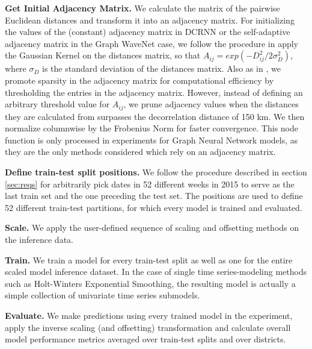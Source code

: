 \vspace{1em}
\noindent
\textbf{Get Initial Adjacency Matrix.}  We calculate the matrix of the pairwise Euclidean distances and transform it into an adjacency matrix.
For initializing the values of the (constant) adjacency matrix in DCRNN or the self-adaptive adjacency matrix in the Graph WaveNet case, we follow the procedure in \cite{li2018dcrnn, wu2019graphwavenet} apply the Gaussian Kernel on the distances matrix, so that $A_{ij} = exp(-D_{ij}^2/2\sigma_{D}^2)$, where $\sigma_{D}$ is the standard deviation of the distances matrix.
Also as in \cite{li2018dcrnn}, we promote sparsity in the adjacency matrix for computational efficiency by thresholding the entries in the adjacency matrix.
However, instead of defining an arbitrary threshold value for $A_{ij}$, we prune adjacency values when the distances they are calculated from surpasses the decorrelation distance of 150 km.
We then normalize columnwise by the Frobenius Norm for faster convergence.
This node function is only processed in experiments for Graph Neural Network models, as they are the only methods considered which rely on an adjacency matrix.

\vspace{1em}
\noindent
\textbf{Define train-test split positions.} We follow the procedure described in section \ref{sec:reqs} for arbitrarily pick dates in 52 different weeks in 2015 to serve as the last train set and the one preceding the test set.
The positions are used to define 52 different train-test partitions, for which every model is trained and evaluated.

\vspace{1em}
\noindent
\textbf{Scale.}  We apply the user-defined sequence of scaling and offsetting methods on the inference data.

\vspace{1em}
\noindent
\textbf{Train.}  We train a model for every train-test split as well as one for the entire scaled model inference dataset.
In the case of single time series-modeling methods such as Holt-Winters Exponential Smoothing, the resulting model is actually a simple collection of univariate time series submodels.

\vspace{1em}
\noindent
\textbf{Evaluate.}  We make predictions using every trained model in the experiment, apply the inverse scaling (and offsetting) transformation and calculate overall model performance metrics averaged over train-test splits and over districts.